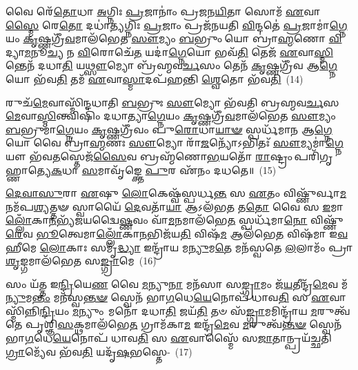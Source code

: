 𑌵𑍈 𑌰𑍇᳴\-\ul{𑌤𑍋}\-𑌧𑌾 \ul{𑌅}\-𑌗𑍍𑌨𑌿𑌃 \ul{𑌪𑍍𑌰}\-𑌜𑌾𑌨𑌾𑌂॑ 𑌪𑍍𑌰𑌜𑌨\-\ul{𑌯𑌿}\-𑌤𑌾 𑌸𑍋𑌮᳴ \ul{𑌏}\-𑌵𑌾\-\ul{𑌸𑍍𑌮𑍈} 𑌰𑍇\-\ul{𑌤𑍋} 𑌦𑌧𑌾॑\-\ul{𑌤𑍍𑌯}\-𑌗𑍍𑌨𑌿𑌃 \ul{𑌪𑍍𑌰}\-𑌜𑌾𑌂 𑌪𑍍𑌰𑌜᳴𑌨𑌯𑌤𑌿 \ul{𑌵𑌿}\-𑌨𑍍𑌦𑌤𑍇॑ \ul{𑌪𑍍𑌰}\-𑌜𑌾𑌮𑌾॑\-\ul{𑌗𑍍𑌨𑍇}\-𑌯𑌂 \ul{𑌕𑍃}\-𑌷𑍍𑌣\-𑌗𑍍𑌰𑍀᳴\-\ul{𑌵}\-𑌮𑌾𑌲᳴𑌭𑍇𑌤 \ul{𑌸𑍗}\-𑌮𑍍𑌯𑌂 \ul{𑌬}\-𑌭𑍍𑌰𑍁𑌂 𑌯𑍋 𑌬𑍍𑌰𑌾॑\-\ul{𑌹𑍍𑌮}\-𑌣𑍋 \ul{𑌵𑌿}\-𑌦𑍍𑌯𑌾\-\ul{𑌮}\-𑌨𑍂\-\ul{𑌚𑍍𑌯} 𑌨 \ul{𑌵𑌿}\-𑌰𑍋𑌚𑍇᳴\-\ul{𑌤} 𑌯𑌦𑌾॑\-\ul{𑌗𑍍𑌨𑍇}\-𑌯𑍋 𑌭𑌵᳴\-\ul{𑌤𑌿} 𑌤𑍇𑌜᳴ \ul{𑌏}\-𑌵𑌾\-\ul{𑌸𑍍𑌮𑌿}\-𑌨𑍍𑌤𑍇𑌨᳴ 𑌦𑌧𑌾\-\ul{𑌤𑌿} 𑌯\-\ul{𑌥𑍍𑌸𑍗}\-𑌮𑍍𑌯𑍋 𑌬𑍍𑌰᳴𑌹𑍍𑌮𑌵\-\ul{𑌰𑍍𑌚}\-𑌸𑌂 𑌤𑍇𑌨᳴ \ul{𑌕𑍃}\-𑌷𑍍𑌣𑌗𑍍𑌰𑍀᳴𑌵 𑌆\-\ul{𑌗𑍍𑌨𑍇}\-𑌯𑍋 𑌭᳴𑌵\-\ul{𑌤𑌿} 𑌤𑌮᳴ \ul{𑌏}\-𑌵𑌾\-\ul{𑌸𑍍𑌮𑌾}\-𑌦𑌪᳴𑌹𑌨𑍍𑌤𑌿 \ul{𑌶𑍍𑌵𑍇}\-𑌤𑍋 𑌭᳴𑌵\-\ul{𑌤𑌿}\-~(14)

𑌰𑍁𑌚᳴\-\ul{𑌮𑍇}\-𑌵𑌾𑌸𑍍𑌮𑌿᳴𑌨𑍍𑌦𑌧𑌾𑌤𑌿 \ul{𑌬}\-𑌭𑍍𑌰𑍁𑌃 \ul{𑌸𑍗}\-𑌮𑍍𑌯𑍋 𑌭᳴𑌵𑌤𑌿 𑌬𑍍𑌰𑌹𑍍𑌮𑌵\-\ul{𑌰𑍍𑌚}\-𑌸\-\-\ul{𑌮𑍇}\-𑌵𑌾\-\ul{𑌸𑍍𑌮𑌿}\-𑌨𑍍𑌤𑍍𑌵𑌿𑌷𑌿𑌂᳴ 𑌦𑌧𑌾𑌤𑍍𑌯𑌾\-\ul{𑌗𑍍𑌨𑍇}\-𑌯𑌂 \ul{𑌕𑍃}\-𑌷𑍍𑌣𑌗𑍍𑌰𑍀᳴\-\ul{𑌵}\-𑌮𑌾𑌲᳴𑌭𑍇𑌤 \ul{𑌸𑍗}\-𑌮𑍍𑌯𑌂 \ul{𑌬}\-𑌭𑍍𑌰𑍁𑌮𑌾॑\-\ul{𑌗𑍍𑌨𑍇}\-𑌯𑌂 \ul{𑌕𑍃}\-𑌷𑍍𑌣𑌗𑍍𑌰𑍀᳴𑌵𑌂 𑌪𑍁\-\ul{𑌰𑍋}\-𑌧𑌾\-\ul{𑌯𑌾}\-\-\ul{𑍟} 𑌸𑍍𑌪𑌰𑍍𑌧᳴𑌮𑌾𑌨 𑌆\-\ul{𑌗𑍍𑌨𑍇}\-𑌯𑍋 𑌵𑍈 𑌬𑍍𑌰𑌾॑\-\ul{𑌹𑍍𑌮}\-𑌣𑌃 \ul{𑌸𑍗}\-𑌮𑍍𑌯𑍋 𑌰𑌾᳴\-\ul{𑌜}\-𑌨𑍍𑌯𑍋᳴\-𑌽𑌭𑌿𑌤𑌃᳴ \ul{𑌸𑍗}\-𑌮𑍍𑌯𑌮𑌾॑\-\ul{𑌗𑍍𑌨𑍇}\-𑌯𑍗 𑌭᳴𑌵\-\ul{𑌤}\-𑌸𑍍𑌤𑍇𑌜᳴\-\ul{𑌸𑍈}\-𑌵 𑌬𑍍𑌰𑌹𑍍𑌮᳴𑌣𑍋\-\ul{𑌭}\-𑌯𑌤𑍋᳴ \ul{𑌰𑌾}\-𑌷𑍍𑌟𑍍𑌰𑌂 𑌪𑌰𑌿᳴\-𑌗𑍃𑌹𑍍𑌣𑌾𑌤𑍍𑌯𑍇\-\ul{𑌕}\-𑌧𑌾 \ul{𑌸}\-𑌮𑌾𑌵𑍃᳴𑌙𑍍𑌕𑍍𑌤𑍇 \ul{𑌪𑍁}\-𑌰 𑌏᳴𑌨𑌂 𑌦𑌧𑌤𑍇॥~(15)

{}

\-\ul{𑌦𑍇}\-\-\ul{𑌵𑌾}\-\-\ul{𑌸𑍁}\-𑌰𑌾 \ul{𑌏}\-𑌷𑍁 \ul{𑌲𑍋}\-𑌕𑍇𑌷𑍍𑌵᳴𑌸𑍍𑌪𑌰𑍍𑌧\-\ul{𑌨𑍍𑌤} 𑌸 \ul{𑌏}\-𑌤𑌂 𑌵𑌿𑌷𑍍𑌣𑍁᳴𑌰𑍍𑌵𑌾\-\ul{𑌮}\-𑌨𑌮᳴\-𑌪\-\ul{𑌶𑍍𑌯}\-𑌤𑍍𑌤𑍟 𑌸𑍍𑌵𑌾𑌯𑍈᳴ \ul{𑌦𑍇}\-𑌵𑌤𑌾᳴\-\ul{𑌯𑌾} 𑌆\-𑌽𑌲᳴𑌭\-\ul{𑌤} 𑌤\-\ul{𑌤𑍋} 𑌵𑍈 𑌸 \ul{𑌇}\-𑌮𑌾\-\ul{𑌲𑍍𑌲𑍋𑌁}\-𑌕𑌾\-\ul{𑌨}\-𑌭𑍍𑌯᳴\-𑌜𑌯𑌦𑍍𑌵𑍈\-\ul{𑌷𑍍𑌣}\-𑌵𑌂 𑌵𑌾᳴\-\ul{𑌮}\-𑌨𑌮𑌾\-𑌲᳴𑌭𑍇\-\ul{𑌤} 𑌸𑍍𑌪𑌰𑍍𑌧᳴𑌮𑌾\-\ul{𑌨𑍋} 𑌵𑌿𑌷𑍍𑌣𑍁᳴\-\ul{𑌰𑍇}\-𑌵 \ul{𑌭𑍂}\-𑌤𑍍𑌵𑍇𑌮𑌾\-\ul{𑌲𑍍𑌲𑍋𑌁}\-𑌕𑌾\-\ul{𑌨}\-𑌭𑌿𑌜᳴𑌯\-\ul{𑌤𑌿} 𑌵𑌿𑌷᳴\-\ul{𑌮} 𑌆\-𑌲᳴𑌭𑍇\-\ul{𑌤} 𑌵𑌿𑌷᳴𑌮𑌾 𑌇\-\ul{𑌵} 𑌹𑍀𑌮𑍇 \ul{𑌲𑍋}\-𑌕𑌾𑌃 𑌸𑌮𑍃᳴\-\ul{𑌦𑍍𑌧𑍍𑌯𑌾} 𑌇𑌨𑍍𑌦𑍍𑌰𑌾᳴𑌯 𑌮\-\ul{𑌨𑍍𑌯𑍁}\-𑌮\-\ul{𑌤𑍇} 𑌮𑌨᳴𑌸𑍍𑌵𑌤𑍇 \ul{𑌲}\-𑌲𑌾𑌮𑌂᳴ 𑌪𑍍𑌰𑌾\-\ul{𑌶𑍃}\-𑌙𑍍𑌗𑌮𑌾𑌲᳴𑌭𑍇𑌤 𑌸\-\ul{𑌙𑍍𑌗𑍍𑌰𑌾}\-𑌮𑍇~(16)

𑌸𑌂 𑌯᳴𑌤𑍍𑌤 𑌇\-\ul{𑌨𑍍𑌦𑍍𑌰𑌿}\-𑌯𑍇\-\ul{𑌣} 𑌵𑍈 \ul{𑌮}\-𑌨𑍍𑌯𑍁\-\ul{𑌨𑌾} 𑌮𑌨᳴𑌸𑌾 𑌸\-\ul{𑌙𑍍𑌗𑍍𑌰𑌾}\-𑌮𑌂 𑌜᳴\-\ul{𑌯}\-𑌤𑍀𑌨𑍍𑌦𑍍𑌰᳴\-\ul{𑌮𑍇}\-𑌵 𑌮᳴\-\ul{𑌨𑍍𑌯𑍁}\-𑌮\-\ul{𑌨𑍍𑌤𑌂} 𑌮𑌨᳴𑌸𑍍𑌵\-\ul{𑌨𑍍𑌤}\-\-\ul{𑍟} 𑌸𑍍𑌵𑍇𑌨᳴ 𑌭𑌾\-\ul{𑌗}\-𑌧𑍇\-\ul{𑌯𑍇}\-𑌨𑍋𑌪᳴ 𑌧𑌾𑌵\-\ul{𑌤𑌿} 𑌸 \ul{𑌏}\-𑌵𑌾𑌸𑍍𑌮𑌿᳴𑌨𑍍𑌨𑌿\-\ul{𑌨𑍍𑌦𑍍𑌰𑌿}\-𑌯𑌂 \ul{𑌮}\-𑌨𑍍𑌯𑍁𑌂 𑌮𑌨𑍋᳴ 𑌦𑌧𑌾\-\ul{𑌤𑌿} 𑌜𑌯᳴\-\ul{𑌤𑌿} 𑌤𑍞 𑌸᳴\-\ul{𑌙𑍍𑌗𑍍𑌰𑌾}\-𑌮𑌮𑌿𑌨𑍍𑌦𑍍𑌰𑌾᳴𑌯 \ul{𑌮}\-𑌰𑍁𑌤𑍍𑌵᳴𑌤𑍇 𑌪𑍃𑌶𑍍𑌞𑌿\-\ul{𑌸}\-𑌕𑍍𑌥𑌮𑌾\-𑌲᳴𑌭𑍇\-\ul{𑌤} 𑌗𑍍𑌰𑌾𑌮᳴𑌕𑌾\-\ul{𑌮} 𑌇𑌨𑍍𑌦𑍍𑌰᳴\-\ul{𑌮𑍇}\-𑌵 \ul{𑌮}\-𑌰𑍁𑌤𑍍𑌵᳴\-\ul{𑌨𑍍𑌤}\-\-\ul{𑍟} 𑌸𑍍𑌵𑍇𑌨᳴ 𑌭𑌾\-\ul{𑌗}\-𑌧𑍇\-\ul{𑌯𑍇}\-𑌨𑍋𑌪᳴ 𑌧𑌾𑌵\-\ul{𑌤𑌿} 𑌸 \ul{𑌏}\-𑌵𑌾𑌸𑍍𑌮𑍈᳴ 𑌸\-\ul{𑌜𑌾}\-𑌤𑌾𑌨𑍍𑌪𑍍𑌰𑌯᳴𑌚𑍍𑌛𑌤𑌿 \ul{𑌗𑍍𑌰𑌾}\-𑌮𑍍𑌯𑍇᳴𑌵 𑌭᳴𑌵\-\ul{𑌤𑌿} 𑌯𑌦𑍃᳴\-\ul{𑌷}\-𑌭𑌸𑍍𑌤𑍇-~(17)

